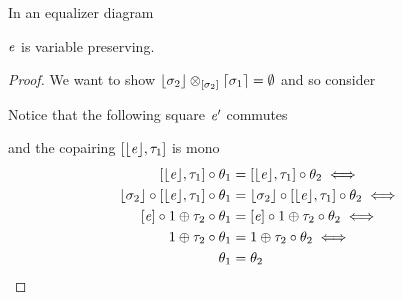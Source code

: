 \begin{lemma}\label{lem:eq-vpres-tempC}
   In an equalizer diagram
    \begin{center}
    \end{center}
    $\mathit{e}$ is variable preserving.
\end{lemma}
\begin{proof}\nl
    We want to show $\lfloor\sigma_2\rfloor \otimes_{[\sigma_2]} \lceil\sigma_1\rceil = \emptyset$ and so consider
    \begin{center}
    \end{center}
    Notice that the following square $\mathit{e}'$ commutes
    \begin{center}
    \end{center}
    and the copairing $[\lfloor\mathit{e}\rfloor, \tau_1]$ is mono
    \begin{align*}
        \copair{\concL\ve}{\tau_1} \comp \theta_1 & = \copair{\concL\ve}{\tau_1} \comp \theta_2 \iff \\
        \concL{\sigma_2} \comp \copair{\concL\ve}{\tau_1} \comp \theta_1 & = \concL{\sigma_2} \comp \copair{\concL\ve}{\tau_1} \comp \theta_2 \iff \\
        \anyL\ve \comp 1 \oplus \tau_2 \comp \theta_1 & = \anyL\ve \comp 1 \oplus \tau_2 \comp \theta_2 \iff \\
        1 \oplus \tau_2 \comp \theta_1 & = 1 \oplus \tau_2 \comp \theta_2 \iff \\
        \theta_1 & = \theta_2
    \end{align*}


\end{proof}
